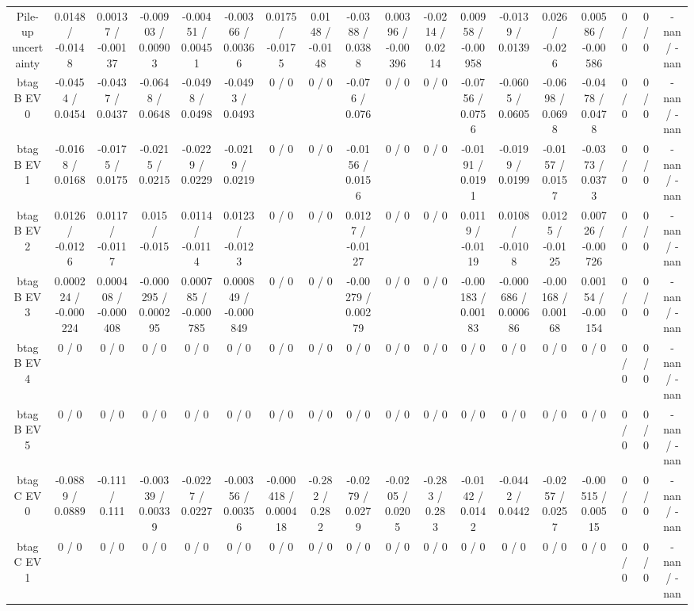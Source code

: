 \documentclass[10pt]{article}
\begin{document}
\begin{table}[htbp]
\begin{center}
\begin{tabular}{|c|c|c|c|c|c|c|c|c|c|c|c|c|c|c|c|c|c|}
  Pile-up uncertainty & 0.0148 / -0.0148 & 0.00137 / -0.00137 & -0.00903 / 0.00903 & -0.00451 / 0.00451 & -0.00366 / 0.00366 & 0.0175 / -0.0175 & 0.0148 / -0.0148 & -0.0388 / 0.0388 & 0.00396 / -0.00396 & -0.0214 / 0.0214 & 0.00958 / -0.00958 & -0.0139 / 0.0139 & 0.026 / -0.026 & 0.00586 / -0.00586 & 0 / 0 & 0 / 0 & -nan / -nan \\ 
  btag B EV 0 & -0.0454 / 0.0454 & -0.0437 / 0.0437 & -0.0648 / 0.0648 & -0.0498 / 0.0498 & -0.0493 / 0.0493 & 0 / 0 & 0 / 0 & -0.076 / 0.076 & 0 / 0 & 0 / 0 & -0.0756 / 0.0756 & -0.0605 / 0.0605 & -0.0698 / 0.0698 & -0.0478 / 0.0478 & 0 / 0 & 0 / 0 & -nan / -nan \\ 
  btag B EV 1 & -0.0168 / 0.0168 & -0.0175 / 0.0175 & -0.0215 / 0.0215 & -0.0229 / 0.0229 & -0.0219 / 0.0219 & 0 / 0 & 0 / 0 & -0.0156 / 0.0156 & 0 / 0 & 0 / 0 & -0.0191 / 0.0191 & -0.0199 / 0.0199 & -0.0157 / 0.0157 & -0.0373 / 0.0373 & 0 / 0 & 0 / 0 & -nan / -nan \\ 
  btag B EV 2 & 0.0126 / -0.0126 & 0.0117 / -0.0117 & 0.015 / -0.015 & 0.0114 / -0.0114 & 0.0123 / -0.0123 & 0 / 0 & 0 / 0 & 0.0127 / -0.0127 & 0 / 0 & 0 / 0 & 0.0119 / -0.0119 & 0.0108 / -0.0108 & 0.0125 / -0.0125 & 0.00726 / -0.00726 & 0 / 0 & 0 / 0 & -nan / -nan \\ 
  btag B EV 3 & 0.000224 / -0.000224 & 0.000408 / -0.000408 & -0.000295 / 0.000295 & 0.000785 / -0.000785 & 0.000849 / -0.000849 & 0 / 0 & 0 / 0 & -0.00279 / 0.00279 & 0 / 0 & 0 / 0 & -0.00183 / 0.00183 & -0.000686 / 0.000686 & -0.00168 / 0.00168 & 0.00154 / -0.00154 & 0 / 0 & 0 / 0 & -nan / -nan \\ 
  btag B EV 4 & 0 / 0 & 0 / 0 & 0 / 0 & 0 / 0 & 0 / 0 & 0 / 0 & 0 / 0 & 0 / 0 & 0 / 0 & 0 / 0 & 0 / 0 & 0 / 0 & 0 / 0 & 0 / 0 & 0 / 0 & 0 / 0 & -nan / -nan \\ 
  btag B EV 5 & 0 / 0 & 0 / 0 & 0 / 0 & 0 / 0 & 0 / 0 & 0 / 0 & 0 / 0 & 0 / 0 & 0 / 0 & 0 / 0 & 0 / 0 & 0 / 0 & 0 / 0 & 0 / 0 & 0 / 0 & 0 / 0 & -nan / -nan \\ 
  btag C EV 0 & -0.0889 / 0.0889 & -0.111 / 0.111 & -0.00339 / 0.00339 & -0.0227 / 0.0227 & -0.00356 / 0.00356 & -0.000418 / 0.000418 & -0.282 / 0.282 & -0.0279 / 0.0279 & -0.0205 / 0.0205 & -0.283 / 0.283 & -0.0142 / 0.0142 & -0.0442 / 0.0442 & -0.0257 / 0.0257 & -0.00515 / 0.00515 & 0 / 0 & 0 / 0 & -nan / -nan \\ 
  btag C EV 1 & 0 / 0 & 0 / 0 & 0 / 0 & 0 / 0 & 0 / 0 & 0 / 0 & 0 / 0 & 0 / 0 & 0 / 0 & 0 / 0 & 0 / 0 & 0 / 0 & 0 / 0 & 0 / 0 & 0 / 0 & 0 / 0 & -nan / -nan \\ 

\end{tabular}
\end{center}
\end{table}
\end{document}
